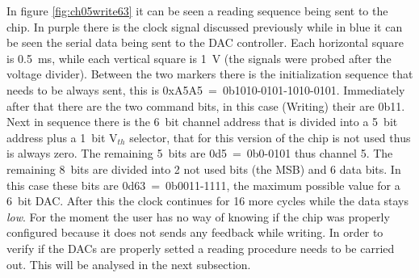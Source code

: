\noindent In figure \ref{fig:ch05write63} it can be seen a reading sequence being sent to the chip. In purple there is the clock signal discussed previously while in blue it can be seen the serial data being sent to the DAC controller.
Each horizontal square is 0.5~ms, while each vertical square is 1~V (the signals were probed after the voltage divider). 
Between the two markers there is the initialization sequence that needs to be always sent, this is 0xA5A5~=~0b1010-0101-1010-0101.
Immediately after that there are the two command bits, in this case (Writing) their are 0b11.
Next in sequence there is the 6~bit channel address that is divided into a 5~bit address plus a 1~bit V$_{th}$ selector, that for this version of the chip is not used thus is always zero.
The remaining 5~bits are 0d5~=~0b0-0101 thus channel 5. The remaining 8~bits are divided into 2 not used bits (the MSB) and 6 data bits.
In this case these bits are 0d63~=~0b0011-1111, the maximum possible value for a 6~bit DAC.
After this the clock continues for 16 more cycles while the data stays \textit{low}.
For the moment the user has no way of knowing if the chip was properly configured because it does not sends any feedback while writing. In order to verify if the DACs are properly setted a reading procedure needs to be carried out. This will be analysed in the next subsection.  

